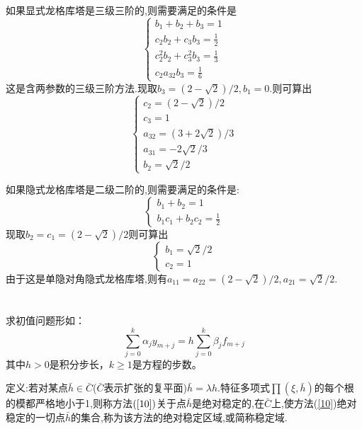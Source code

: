 \documentclass{article}
\begin{document}
\begin{CJK}{UTF8}{gkai}
如果显式龙格库塔是三级三阶的,则需要满足的条件是
\begin{equation}
\begin{cases}
b_{1}+b_{2}+b_{3}=1\\
c_{2}b_{2}+c_{3}b_{3}=\frac{1}{2}\\
c_{2}^2b_{2}+c_{3}^2b_{3}=\frac{1}{3}\\
c_{2}a_{32}b_{3}=\frac{1}{6}
\end{cases}
\end{equation}
这是含两参数的三级三阶方法.现取$b_{3}=(2-\sqrt{2})/2,b_{1}=0.$则可算出
\begin{equation}
\begin{cases}
c_{2}=(2-\sqrt{2})/2\\
c_{3}=1\\
a_{32}=(3+2\sqrt{2})/3\\
a_{31}=-2\sqrt{2}/3\\
b_{2}=\sqrt{2}/2
\end{cases}
\end{equation}

如果隐式龙格库塔是二级二阶的,则需要满足的条件是:
\begin{equation}
\begin{cases}
b_{1}+b_{2}=1\\
b_{1}c_{1}+b_{2}c_{2}=\frac{1}{2}
\end{cases}
\end{equation}
现取$b_{2}=c_{1}=(2-\sqrt{2})/2$则可算出
\begin{equation}
\begin{cases}
b_{1}=\sqrt{2}/2\\
c_{2}=1
\end{cases}
\end{equation}
由于这是单隐对角隐式龙格库塔,则有$a_{11}=a_{22}=(2-\sqrt{2})/2,a_{21}=\sqrt{2}/2$.
~\\
~\\
~\\
求初值问题形如：
\begin{equation}
\sum_{j=0}^{k}\alpha_{j}y_{m+j}=h\sum_{j=0}^{k}\beta_{j}f_{m+j}
\label{10}
\end{equation}
其中$h>0$是积分步长，$k\ge 1$是方程的步数。

定义:若对某点$\bar{h}\in \bar{C}$($\bar{C}$表示扩张的复平面)$\bar{h}=\lambda h$.特征多项式$\prod(\xi ,\bar{h})$的每个根的模都严格地小于1,则称方法$(\ref{10})$关于点$\bar{h}$是绝对稳定的,在$\bar{C}$上,使方法(\ref{10})绝对稳定的一切点$\bar{h}$的集合,称为该方法的绝对稳定区域,或简称稳定域.


\end{CJK}
\end{document}
